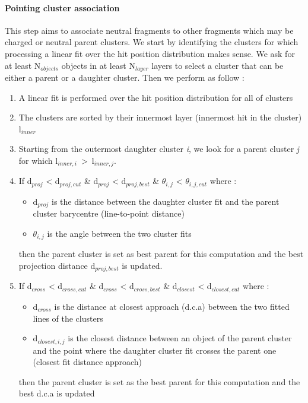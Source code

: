 \documentclass[cits]{JINST}
\begin{document}
\paragraph*{Pointing cluster association} This step aims to associate neutral fragments to other fragments which may be charged or neutral parent clusters. We start by identifying the clusters for which processing a linear fit over the hit position distribution makes sense. We ask for at least N$_{objects}$ objects in at least N$_{layer}$ layers to select a cluster that can be either a parent or a daughter cluster. Then we perform as follow :

\begin{enumerate}
  \item A linear fit is performed over the hit position distribution for all of clusters
  \item The clusters are sorted by their innermost layer (innermost hit in the cluster) l$_{inner}$
  \item Starting from the outermost daughter cluster \textit{i}, we look for a parent cluster \textit{j} for which l$_{inner,i}$~>~l$_{inner,j}$.
  \item If d$_{proj}$ < d$_{proj,cut}$ \& d$_{proj}$ < d$_{proj,best}$ \& $\theta_{i,j}$ < $\theta_{i,j,cut}$  where :
  \begin{itemize}
    \item d$_{proj}$ is the distance between the daughter cluster fit and the parent cluster barycentre (line-to-point distance)
    \item $\theta_{i,j}$ is the angle between the two cluster fits
  \end{itemize}
  then the parent cluster is set as best parent for this computation and the best projection distance d$_{proj,best}$ is updated.
  \item If d$_{cross}$ < d$_{cross,cut}$ \& d$_{cross}$ < d$_{cross,best}$ \& d$_{closest}$ < d$_{closest,cut}$ where :
  \begin{itemize}
    \item d$_{cross}$ is the distance at closest approach (d.c.a) between the two fitted lines of the clusters
    \item d$_{closest,i,j}$ is the closest distance between an object of the parent cluster and the point where the daughter cluster fit crosses the parent one (closest fit distance approach) 
  \end{itemize}
  then the parent cluster is set as the best parent for this computation and the best d.c.a is updated

\end{enumerate}
\end{document}
